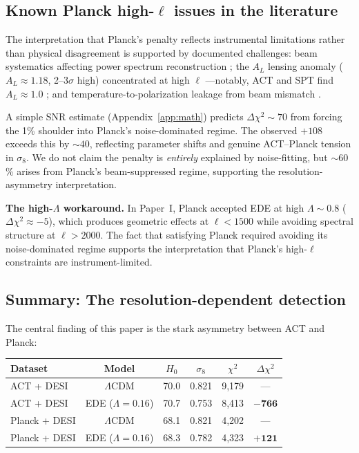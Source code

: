 \documentclass[twocolumn,showpacs,preprintnumbers,amsmath,amssymb,prd]{revtex4-2}
\newcommand{\lcdm}{$\Lambda$CDM}
\begin{document}
\subsection{Known Planck high-$\ell$ issues in the literature}

The interpretation that Planck's penalty reflects instrumental limitations rather 
than physical disagreement is supported by documented challenges: beam systematics 
affecting power spectrum reconstruction \cite{Planck2013VII,Planck2016HFI,Rocha2009}; 
the $A_L$ lensing anomaly ($A_L \approx 1.18$, 2--3$\sigma$ high) concentrated at 
high $\ell$ \cite{Planck2018VI}---notably, ACT and SPT find $A_L \approx 1.0$ 
\cite{ACT2020,SPT2021}; and temperature-to-polarization leakage from beam 
mismatch \cite{Miller2009,Hivon2016,Delouis2019}.

A simple SNR estimate (Appendix~\ref{app:math}) predicts $\Delta\chi^2 \sim 70$ 
from forcing the 1\% shoulder into Planck's noise-dominated regime. The observed 
$+108$ exceeds this by $\sim 40$, reflecting parameter shifts and genuine 
ACT--Planck tension in $\sigma_8$. We do not claim the penalty is \emph{entirely} 
explained by noise-fitting, but $\sim 60$\% arises from Planck's beam-suppressed 
regime, supporting the resolution-asymmetry interpretation.

\textbf{The high-$\Lambda$ workaround.} In Paper~I, Planck accepted EDE at high 
$\Lambda \sim 0.8$ ($\Delta\chi^2 \approx -5$), which produces geometric effects 
at $\ell < 1500$ while avoiding spectral structure at $\ell > 2000$. The fact 
that satisfying Planck required avoiding its noise-dominated regime supports 
the interpretation that Planck's high-$\ell$ constraints are instrument-limited.

\subsection{Summary: The resolution-dependent detection}

The central finding of this paper is the stark asymmetry between ACT and Planck:
\begin{center}
\begin{tabular}{lccccc}
\toprule
Dataset & Model & $H_0$ & $\sigma_8$ & $\chi^2$ & $\Delta\chi^2$ \\
\midrule
ACT + DESI & \lcdm & 70.0 & 0.821 & 9{,}179 & --- \\
ACT + DESI & EDE ($\Lambda = 0.16$) & 70.7 & 0.753 & 8{,}413 & $\mathbf{-766}$ \\
\midrule
Planck + DESI & \lcdm & 68.1 & 0.821 & 4{,}202 & --- \\
Planck + DESI & EDE ($\Lambda = 0.16$) & 68.3 & 0.782 & 4{,}323 & $\mathbf{+121}$ \\
\bottomrule
\end{tabular}
\end{center}
\end{document}

